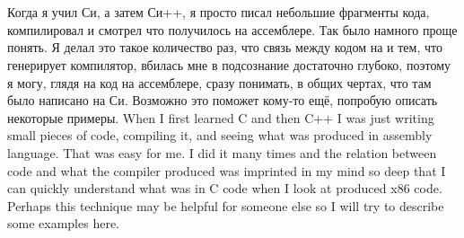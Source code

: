 \chapter{}

\IFRU
{Когда я учил Си, а затем Си++, я просто писал небольшие фрагменты кода, компилировал и смотрел что 
получилось на ассемблере. Так было намного проще понять. Я делал это такое количество раз, 
что связь между кодом на \CCpp и тем, что генерирует компилятор, вбилась мне в подсознание достаточно 
глубоко, поэтому я могу, глядя на код на ассемблере, сразу понимать, в общих чертах, что там было написано 
на Си. Возможно это поможет кому-то ещё, попробую описать некоторые примеры.}
{When I first learned C and then C++ I was just writing small pieces of code, compiling it, 
and seeing what 
was produced in assembly language. That was easy for me. I did it many times and the relation 
between \CCpp code and what the compiler produced was imprinted in my mind so deep that 
I can quickly understand what was in C code when I look at produced x86 code. 
Perhaps this technique may be helpful for someone else so I will try to describe some examples here.}


























